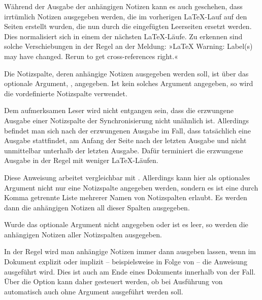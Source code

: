 Während der Ausgabe der anhängigen Notizen kann es auch geschehen, dass
irrtümlich Notizen ausgegeben werden, die im
vorherigen \LaTeX-Lauf auf den Seiten erstellt wurden, die nun durch die
eingefügten Leerseiten ersetzt werden. Dies normalisiert sich in einem der
nächsten \LaTeX-Läufe. Zu erkennen sind solche Verschiebungen in der Regel an
der Meldung: »\LaTeX{} Warning: Label(s) may have changed. Rerun to get
cross-references right.«

Die Notizspalte, deren anhängige Notizen ausgegeben werden soll, ist über das
optionale Argument, , angegeben. Ist kein solches
Argument angegeben, so wird die vordefinierte Notizspalte 
verwendet.

Dem aufmerksamen Leser wird
nicht entgangen sein, dass die erzwungene Ausgabe einer Notizspalte der
Synchronisierung nicht unähnlich ist. Allerdings befindet man sich nach der
erzwungenen Ausgabe im Fall, dass tatsächlich eine Ausgabe stattfindet, am
Anfang der Seite nach der letzten Ausgabe und nicht unmittelbar unterhalb der
letzten Ausgabe. Dafür terminiert die erzwungene Ausgabe in der Regel mit
weniger \LaTeX-Läufen.%
\EndIndexGroup


\begin{Declaration}
\end{Declaration}
Diese Anweisung arbeitet vergleichbar mit
. Allerdings kann hier als optionales
Argument nicht nur eine Notizspalte angegeben werden, sondern es ist eine
durch Komma getrennte Liste mehrerer Namen von Notizspalten erlaubt. Es werden
dann die anhängigen Notizen all dieser Spalten ausgegeben.

Wurde das optionale Argument nicht angegeben oder ist es leer, so werden die
anhängigen Notizen aller Notizspalten ausgegeben.%
\EndIndexGroup


\begin{Declaration}
\end{Declaration}
In der Regel wird man anhängige Notizen immer dann ausgeben lassen, wenn im
Dokument explizit oder implizit -- beispielsweise in Folge von
 -- die Anweisung 
ausgeführt wird. Dies ist auch am Ende eines Dokuments innerhalb von
 der Fall. Über die Option
 kann daher gesteuert werden, ob bei Ausführung
von  automatisch auch
 ohne Argument ausgeführt werden
soll.

